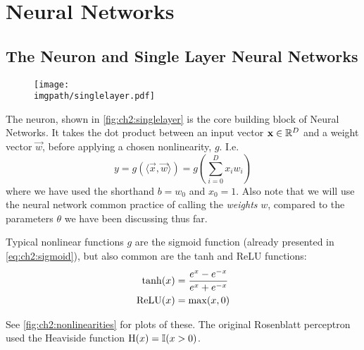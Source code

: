 \section{Neural Networks}\label{sec:ch2:cnns}
\subsection{The Neuron and Single Layer Neural Networks}

\begin{figure}
  \centering
  \texttt{[image: \\imgpath/singlelayer.pdf]}
  \label{fig:ch2:singlelayer}
\end{figure}

The neuron, shown in \autoref{fig:ch2:singlelayer} is the core building block of
Neural Networks. It takes the dot product between an input vector $\vec{x} \in
\reals[D]$ and a weight vector $\vec{w}$, before applying a chosen nonlinearity,
$g$. I.e.
%
\begin{equation}
  y = g(\langle\vec{x}, \vec{w}\rangle) = g\left(\sum_{i=0}^{D} x_i w_i \right) 
\end{equation}
%
where we have used the shorthand $b=w_0$ and $x_0 = 1$. Also note that we will
use the neural network common practice of calling the \emph{weights} $w$,
compared to the parameters $\theta$ we have been discussing thus far.

Typical nonlinear functions $g$ are the sigmoid function (already presented in 
\eqref{eq:ch2:sigmoid}), but also common are the tanh and ReLU functions:
\begin{align}
  \F{tanh}(x) &= \frac{e^{x} - e^{-x}}{e^{x} + e^{-x}} \label{eq:ch2:tanh}\\
  \F{ReLU}(x) &= \max (x, 0) \label{eq:ch2:relu}
\end{align}

See \autoref{fig:ch2:nonlinearities} for plots of these. The original Rosenblatt
perceptron \cite{rosenblatt_perceptron:_1958} used the Heaviside function
$\F{H}(x) = \mathbb{I}(x > 0)$. %

